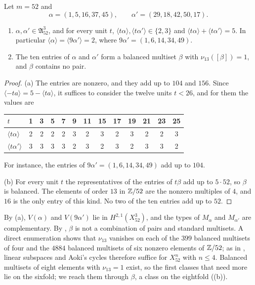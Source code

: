 \begin{lemma}\label{lem:char52}
Let $m=52$ and
\[
  \alpha=(1,5,16,37,45),\qquad \alpha'=(29,18,42,50,17).
\]
\begin{enumerate}[label=\textup{(\alph*)}]
\item $\alpha,\alpha'\in\mathfrak A^{3}_{52}$, and for every unit $t$,
$\langle t\alpha\rangle,\langle t\alpha'\rangle\in\{2,3\}$ and $\langle
t\alpha\rangle+\langle t\alpha'\rangle=5$. In particular $\langle\alpha
\rangle=\langle9\alpha'\rangle=2$, where $9\alpha'=(1,6,14,34,49)$.
\item The ten entries of $\alpha$ and $\alpha'$ form a balanced multiset
$\beta$ with $\nu_{13}([\beta])=1$, and $\beta$ contains no pair.
\end{enumerate}
\end{lemma}

\begin{proof}
(a) The entries are nonzero, and they add up to $104$ and $156$. Since
$\langle-ta\rangle=5-\langle ta\rangle$, it suffices to consider the twelve
units $t<26$, and for them the values are
\begin{center}
\small
\begin{tabular}{l*{12}{c}}
\toprule
$t$ & 1 & 3 & 5 & 7 & 9 & 11 & 15 & 17 & 19 & 21 & 23 & 25\\
\midrule
$\langle t\alpha\rangle$ & 2&2&2&2&3&2&3&2&3&2&2&3\\
$\langle t\alpha'\rangle$ & 3&3&3&3&2&3&2&3&2&3&3&2\\
\bottomrule
\end{tabular}
\end{center}
For instance, the entries of $9\alpha'=(1,6,14,34,49)$ add up to $104$.

(b) For every unit $t$ the representatives of the entries of $t\beta$ add up
to $5\cdot52$, so $\beta$ is balanced. The elements of order $13$ in
$\mathbb{Z}/52$ are the nonzero multiples of $4$, and $16$ is the only entry of
this kind. No two of the ten entries add up to $52$.
\end{proof}

By (a), $V(\alpha)$ and $V(9\alpha')$ lie in $H^{2,1}(X^{3}_{52})$, and the
types of $M_{\alpha}$ and $M_{\alpha'}$ are complementary. By ,
$\beta$ is not a combination of pairs and standard multisets. A direct
enumeration shows that $\nu_{13}$ vanishes on each of the $399$ balanced
multisets of four and the $4884$ balanced multisets of six nonzero elements
of $\mathbb{Z}/52$; as in , linear subspaces and Aoki's cycles
therefore suffice for $X^{n}_{52}$ with $n\le4$. Balanced multisets of eight
elements with $\nu_{13}=1$ exist, so the first classes that need more lie on
the sixfold; we reach them through $\beta$, a class on the eightfold
((b)).

